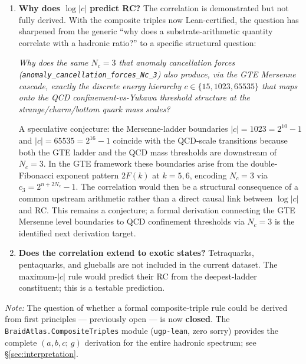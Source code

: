 \documentclass[12pt,a4paper]{article}
\begin{document}
\begin{enumerate}[leftmargin=2em]
  \item \textbf{Why does $\log|c|$ predict RC?}
    The correlation is demonstrated but not fully derived.
    With the composite triples now Lean-certified, the question has sharpened
    from the generic ``why does a substrate-arithmetic quantity correlate with
    a hadronic ratio?'' to a specific structural question:

    \emph{Why does the same $N_c = 3$ that anomaly cancellation forces
    (\nolinkurl{anomaly_cancellation_forces_Nc_3}) also produce,
    via the GTE Mersenne cascade, exactly the discrete energy hierarchy
    $c \in \{15, 1023, 65535\}$ that maps onto the QCD confinement-vs-Yukawa
    threshold structure at the strange/charm/bottom quark mass scales?}

    A speculative conjecture: the Mersenne-ladder boundaries $|c| = 1023 = 2^{10}-1$
    and $|c| = 65535 = 2^{16}-1$ coincide with the QCD-scale transitions
    because both the GTE ladder and the QCD mass thresholds are downstream
    of $N_c = 3$.
    In the GTE framework these boundaries arise from the double-Fibonacci exponent
    pattern $2F(k)$ at $k=5,6$, encoding $N_c = 3$ via $c_3 = 2^{n+2N_c}-1$.
    The correlation would then be a structural consequence of a common upstream
    arithmetic rather than a direct causal link between $\log|c|$ and RC.
    This remains a conjecture; a formal derivation connecting the GTE Mersenne
    level boundaries to QCD confinement thresholds via $N_c = 3$ is the
    identified next derivation target.

  \item \textbf{Does the correlation extend to exotic states?}
    Tetraquarks, pentaquarks, and glueballs are not included in the current
    dataset.
    The maximum-$|c|$ rule would predict their RC from the deepest-ladder
    constituent; this is a testable prediction.
\end{enumerate}

\smallskip\noindent
\textit{Note:} The question of whether a formal composite-triple rule could be derived
from first principles --- previously open --- is now \textbf{closed}.
The \texttt{BraidAtlas.CompositeTriples} module (\texttt{ugp-lean}, zero sorry) provides
the complete $(a,b,c;\,g)$ derivation for the entire hadronic spectrum; see \S\ref{sec:interpretation}.

\end{document}
